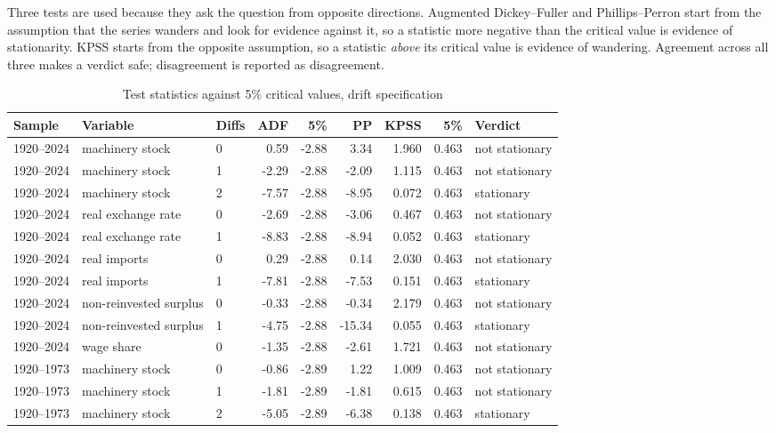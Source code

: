 \documentclass[11pt]{article}
\begin{document}
Three tests are used because they ask the question from opposite directions. Augmented Dickey--Fuller and Phillips--Perron start from the assumption that the series wanders and look for evidence against it, so a statistic more negative than the critical value is evidence of stationarity. KPSS starts from the opposite assumption, so a statistic \emph{above} its critical value is evidence of wandering. Agreement across all three makes a verdict safe; disagreement is reported as disagreement.

\begin{table}[H]
\centering
\caption{Test statistics against 5\% critical values, drift specification}
\footnotesize
\begin{tabular}{p{1.9cm}p{2.6cm}p{1.1cm}rrrrrp{2.0cm}}
\toprule
\textbf{Sample} & \textbf{Variable} & \textbf{Diffs} & \textbf{ADF} & \textbf{5\%} & \textbf{PP} & \textbf{KPSS} & \textbf{5\%} & \textbf{Verdict} \\
\midrule
1920--2024 & machinery stock & 0 & 0.59 & -2.88 & 3.34 & 1.960 & 0.463 & not stationary \\
1920--2024 & machinery stock & 1 & -2.29 & -2.88 & -2.09 & 1.115 & 0.463 & not stationary \\
1920--2024 & machinery stock & 2 & -7.57 & -2.88 & -8.95 & 0.072 & 0.463 & stationary \\
1920--2024 & real exchange rate & 0 & -2.69 & -2.88 & -3.06 & 0.467 & 0.463 & not stationary \\
1920--2024 & real exchange rate & 1 & -8.83 & -2.88 & -8.94 & 0.052 & 0.463 & stationary \\
1920--2024 & real imports & 0 & 0.29 & -2.88 & 0.14 & 2.030 & 0.463 & not stationary \\
1920--2024 & real imports & 1 & -7.81 & -2.88 & -7.53 & 0.151 & 0.463 & stationary \\
1920--2024 & non-reinvested surplus & 0 & -0.33 & -2.88 & -0.34 & 2.179 & 0.463 & not stationary \\
1920--2024 & non-reinvested surplus & 1 & -4.75 & -2.88 & -15.34 & 0.055 & 0.463 & stationary \\
1920--2024 & wage share & 0 & -1.35 & -2.88 & -2.61 & 1.721 & 0.463 & not stationary \\
1920--1973 & machinery stock & 0 & -0.86 & -2.89 & 1.22 & 1.009 & 0.463 & not stationary \\
1920--1973 & machinery stock & 1 & -1.81 & -2.89 & -1.81 & 0.615 & 0.463 & not stationary \\
1920--1973 & machinery stock & 2 & -5.05 & -2.89 & -6.38 & 0.138 & 0.463 & stationary \\

\end{tabular}
\end{table}
\end{document}
